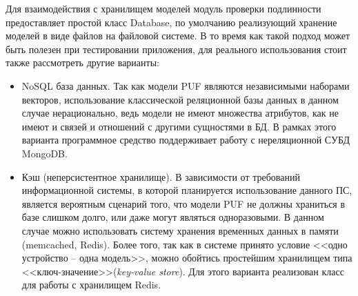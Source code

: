 Для взаимодействия с хранилищем моделей модуль проверки подлинности предоставляет простой класс Database, по умолчанию реализующий хранение моделей в виде файлов на файловой системе. В то время как такой подход может быть полезен при тестировании приложения, для реального использования стоит также рассмотреть другие варианты:
\begin{itemize}
  \item NoSQL база данных. Так как модели PUF являются независимыми наборами векторов, использование классической реляционной базы данных в данном случае нерационально, ведь модели не имеют множества атрибутов, как не имеют и связей и отношений с другими сущностями в БД. В рамках этого варианта программное средство поддерживает работу с нереляционной СУБД MongoDB.
  \item Кэш (неперсистентное хранилище). В зависимости от требований информационной системы, в которой планируется использование данного ПС, является вероятным сценарий того, что модели PUF не должны храниться в базе слишком долго, или даже могут являться одноразовыми. В данном случае можно использовать систему хранения временных данных в памяти (memcached, Redis). Более того, так как в системе принято условие <<одно устройство -- одна модель>>, можно обойтись простейшим хранилищем типа <<ключ-значение>>(\emph{key-value store}). Для этого варианта реализован класс для работы с хранилищем Redis.
\end{itemize}

